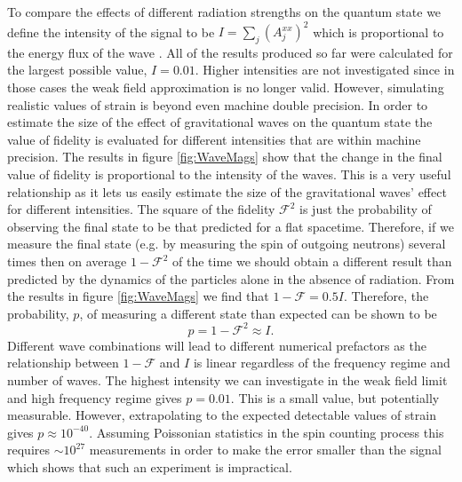 To compare the effects of different radiation strengths on the quantum
state we define the intensity of the signal to be $I = \sum_j
(A^{xx}_j)^2$ which is proportional to the energy flux of the wave
\cite{hobson}. All of the results produced so far were calculated for
the largest possible value, $I = 0.01$. Higher intensities are not
investigated since in those cases the weak field approximation is no
longer valid. However, simulating realistic values of strain is beyond
even machine double precision. In order to estimate the size of the
effect of gravitational waves on the quantum state the value of
fidelity is evaluated for different intensities that are within
machine precision. The results in figure \ref{fig:WaveMags} show that
the change in the final value of fidelity is proportional to the
intensity of the waves. This is a very useful relationship as it lets
us easily estimate the size of the gravitational waves' effect for
different intensities. The square of the fidelity $\mathcal{F}^2$ is
just the probability of observing the final state to be that predicted
for a flat spacetime. Therefore, if we measure the final state
(e.g. by measuring the spin of outgoing neutrons) several times then
on average $1 - \mathcal{F}^2$ of the time we should obtain a
different result than predicted by the dynamics of the particles alone
in the absence of radiation. From the results in figure
\ref{fig:WaveMags} we find that $1 - \mathcal{F} = 0.5I$. Therefore,
the probability, $p$, of measuring a different state than expected can
be shown to be
\begin{equation}\label{eq:prob}
p = 1 - \mathcal{F}^2 \approx I.
\end{equation}
Different wave combinations will lead to different numerical
prefactors as the relationship between $1 - \mathcal{F}$ and $I$ is
linear regardless of the frequency regime and number of waves. The
highest intensity we can investigate in the weak field limit and high
frequency regime gives $p=0.01$. This is a small value, but
potentially measurable. However, extrapolating to the expected
detectable values of strain gives $p \approx 10^{-40}$. Assuming
Poissonian statistics in the spin counting process this requires
$\sim10^{27}$ measurements in order to make the error smaller than the
signal which shows that such an experiment is impractical.

